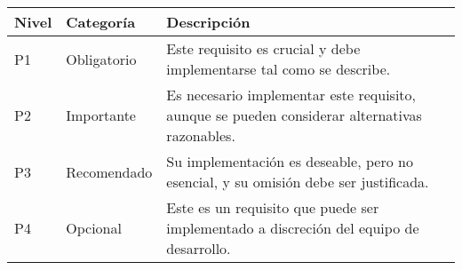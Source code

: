 	\begin{tabular}{p{}p{}p{}}
	\toprule
	\textbf{Nivel} & \textbf{Categoría} & \textbf{Descripción} \\
	\midrule
	P1 & Obligatorio & Este requisito es crucial y debe implementarse tal como se describe. \\
	P2 & Importante & Es necesario implementar este requisito, aunque se pueden considerar alternativas razonables. \\
	P3 & Recomendado & Su implementación es deseable, pero no esencial, y su omisión debe ser justificada. \\
	P4 & Opcional & Este es un requisito que puede ser implementado a discreción del equipo de desarrollo. \\
	\bottomrule
\end{tabular}

